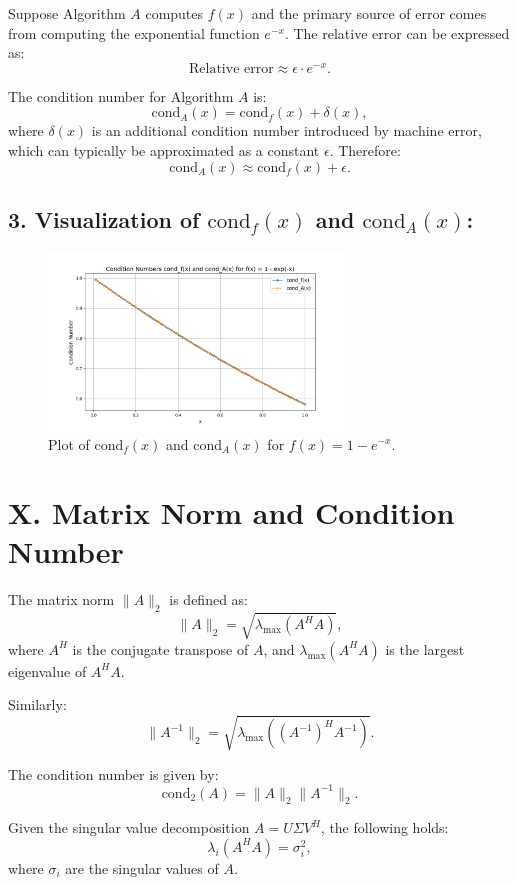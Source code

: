 \documentclass{article}
\begin{document}
Suppose Algorithm \( A \) computes \( f(x) \) and the primary source of error comes from computing the exponential function \( e^{-x} \). The relative error can be expressed as:
\[
\text{Relative error} \approx \epsilon \cdot e^{-x}.
\]

The condition number for Algorithm \( A \) is:
\[
\text{cond}_A(x) = \text{cond}_f(x) + \delta(x),
\]
where \( \delta(x) \) is an additional condition number introduced by machine error, which can typically be approximated as a constant \( \epsilon \). Therefore:
\[
\text{cond}_A(x) \approx \text{cond}_f(x) + \epsilon.
\]

\subsection{3. Visualization of \( \text{cond}_{f}(x) \) and \( \text{cond}_{A}(x) \):}
\begin{figure}[h!]
    \centering
    \includegraphics[width=0.7\textwidth]{Figure_1.png}
    \caption{Plot of \( \text{cond}_{f}(x) \) and \( \text{cond}_{A}(x) \) for \( f(x) = 1 - e^{-x} \).}
    \label{fig:cond_plot}
\end{figure}


\section{X. Matrix Norm and Condition Number}

The matrix norm \( \|A\|_2 \) is defined as:
\[
\|A\|_2 = \sqrt{\lambda_{\max}(A^H A)},
\]
where \( A^H \) is the conjugate transpose of \( A \), and \( \lambda_{\max}(A^H A) \) is the largest eigenvalue of \( A^H A \).

Similarly:
\[
\|A^{-1}\|_2 = \sqrt{\lambda_{\max}((A^{-1})^H A^{-1})}.
\]

The condition number is given by:
\[
\text{cond}_2(A) = \|A\|_2 \|A^{-1}\|_2.
\]

Given the singular value decomposition \( A = U \Sigma V^H \), the following holds:
\[
\lambda_i(A^H A) = \sigma_i^2,
\]
where \( \sigma_i \) are the singular values of \( A \).
\end{document}
